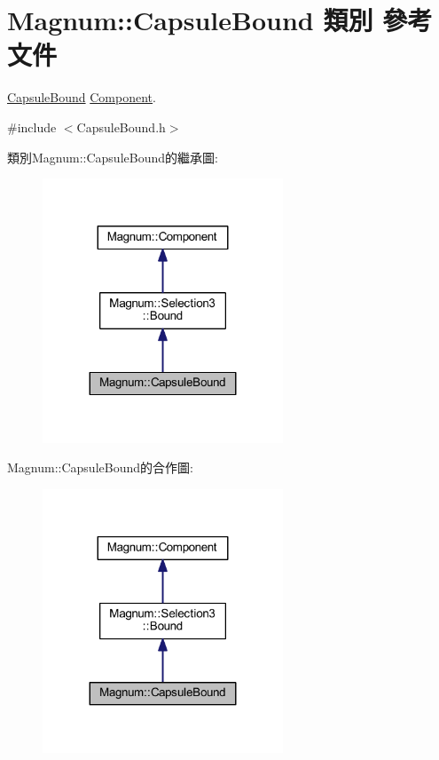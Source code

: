 \hypertarget{class_magnum_1_1_capsule_bound}{}\section{Magnum\+:\+:Capsule\+Bound 類別 參考文件}
\label{class_magnum_1_1_capsule_bound}


\hyperlink{class_magnum_1_1_capsule_bound}{Capsule\+Bound} \hyperlink{class_magnum_1_1_component}{Component}.  




{\ttfamily \#include $<$Capsule\+Bound.\+h$>$}



類別\+Magnum\+:\+:Capsule\+Bound的繼承圖\+:\nopagebreak
\begin{figure}[H]
\begin{center}
\leavevmode
\includegraphics[width=203pt]{class_magnum_1_1_capsule_bound__inherit__graph}
\end{center}
\end{figure}


Magnum\+:\+:Capsule\+Bound的合作圖\+:\nopagebreak
\begin{figure}[H]
\begin{center}
\leavevmode
\includegraphics[width=203pt]{class_magnum_1_1_capsule_bound__coll__graph}
\end{center}
\end{figure}
